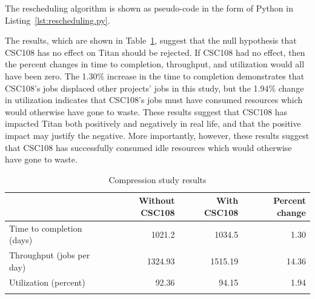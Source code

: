 The rescheduling algorithm is shown as pseudo-code in the form of Python in
Listing~\ref{lst:rescheduling.py}.



The results, which are shown in Table~\ref{tab:compression-results}, suggest
that the null hypothesis that CSC108 has no effect on Titan should be rejected.
If CSC108 had no effect, then the percent changes in time to completion,
throughput, and utilization would all have been zero. The 1.30\% increase in
the time to completion demonstrates that CSC108's jobs displaced other
projects' jobs in this study, but the 1.94\% change in utilization indicates
that CSC108's jobs must have consumed resources which would otherwise have gone
to waste. These results suggest that CSC108 has impacted Titan both positively
and negatively in real life, and that the positive impact may justify the
negative. More importantly, however, these results suggest that CSC108 has
successfully consumed idle resources which would otherwise have gone to waste.


\begin{table}
\caption{Compression study results}
\label{tab:compression-results}       %
\begin{tabular}{lrrr}
\hline\noalign{\smallskip}
\phantom{booga}     &   Without CSC108  &   With CSC108 &   Percent change  \\
\hline\noalign{\smallskip}
Time to completion (days)           &   1021.2  &   1034.5  &   1.30        \\
Throughput (jobs per day)           &   1324.93 &   1515.19 &   14.36       \\
Utilization (percent)               &   92.36   &   94.15   &   1.94        \\
\noalign{\smallskip}\hline
\end{tabular}
\end{table}


